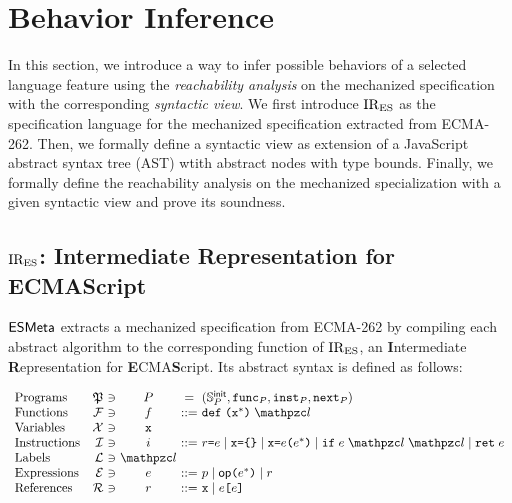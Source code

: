 \section{Behavior Inference}\label{sec:infer}

In this section, we introduce a way to infer possible behaviors of a selected
language feature using the \textit{reachability analysis} on the mechanized
specification with the corresponding \textit{syntactic view}.  We first
introduce $\text{IR}_\text{ES}$ as the specification language for the mechanized specification
extracted from ECMA-262.  Then, we formally define a syntactic view as extension
of a JavaScript abstract syntax tree (AST) wtith abstract nodes with type
bounds.  Finally, we formally define the reachability analysis on the mechanized
specialization with a given syntactic view and prove its soundness.

\subsection{$\text{IR}_\text{ES}$: Intermediate Representation for ECMAScript}

$\esmeta$ extracts a mechanized specification from ECMA-262 by compiling each
abstract algorithm to the corresponding function of $\text{IR}_\text{ES}$, an
\textbf{I}ntermediate \textbf{R}epresentation for \textbf{E}CMA\textbf{S}cript.
Its abstract syntax is defined as follows:

\[
  \begin{array}{lr@{~}c@{~}c@{~}c@{~}l}
    \text{Programs} & \progset &\ni& \prog &=& (\initstset{\prog},
    \getfunc{\prog}, \getinst{\prog}, \getnext{\prog})\\

    \text{Functions} & \funcset &\ni& \func &::=&
    \kwdef \; \kwrl \varx^* \kwrr \; \lab\\

    \text{Variables} & \varset &\ni& \varx\\

    \text{Instructions} & \instset &\ni& \inst &::=&
    \refer \kweq \expr \mid
    \varx \kweq \kwcl \kwcr \mid
    \varx \kweq \expr \kwrl \expr^* \kwrr \mid
    \kwif \; \expr \; \lab \; \lab \mid
    \kwret \; \expr\\

    \text{Labels} & \labset &\ni& \lab\\

    \text{Expressions} & \exprset &\ni& \expr &::=&
    \pval \mid
    \op \kwrl \expr^* \kwrr \mid
    \refer\\

    \text{References} & \referset &\ni& \refer &::=&
    \varx \mid \expr \kwsl \expr \kwsr\\
  \end{array}
\]

